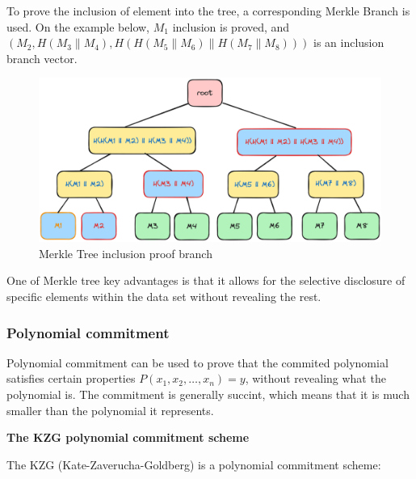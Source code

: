 \documentclass[../lecture-notes.tex]{subfiles}
\begin{document}
To prove the inclusion of element into the tree, a corresponding Merkle Branch is used. On the example below, $M_1$ inclusion is proved, and 
$(M_2, H(M_3 \parallel M_4), H(H(M_5 \parallel M_6) \parallel H(M_7 \parallel M_8)))$ is an inclusion branch vector.

\begin{figure}[H]
    \centering\includegraphics[width=0.9\linewidth, clip]{images/lecture_5/MerkleTreeProof.png}

    \caption{Merkle Tree inclusion proof branch}
\end{figure}

One of Merkle tree key advantages is that it allows for the selective disclosure of specific elements within the data set without revealing the rest. 

\subsubsection{Polynomial commitment}

Polynomial commitment can be used to prove that the commited polynomial satisfies certain properties $P(x_1, x_2, \ldots, x_n) = y$, without revealing what the polynomial is.
The commitment is generally succint, which means that it is much smaller than the polynomial it represents.

\vspace{0.5 cm}

\textbf{The KZG polynomial commitment scheme}

\vspace{0.5 cm}


The KZG (Kate-Zaverucha-Goldberg) is a polynomial commitment scheme:
\end{document}
